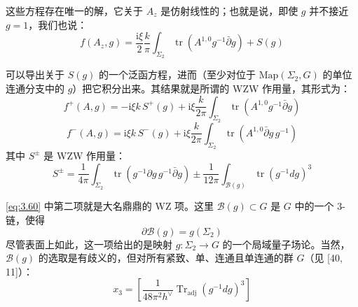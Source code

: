 这些方程存在唯一的解，它关于 $A_{z}$ 是仿射线性的；也就是说，即使 $g$ 并不接近 $g=1$，我们也说：
\begin{equation}
  f(A_{z},g)=\frac{\mathrm{i}\xi}{2}\frac{k}{\pi}\int_{\Sigma_2}\operatorname{tr}\left(A^{1,0}g^{-1}\bar\partial g\right)+S(g)
  \tag{3.57}
  \label{eq:3.57}
\end{equation}

可以导出关于 $S(g)$ 的一个泛函方程，进而（至少对位于 $\mathrm{Map}(\Sigma_2,G)$ 的单位连通分支中的 $g$）把它积分出来。其结果就是所谓的 WZW 作用量，其形式为：
\begin{equation}
  f^{+}(A,g)=-\mathrm{i}\xi k\,S^{+}(g)+\mathrm{i}\xi\frac{k}{2\pi}\int_{\Sigma_2}\operatorname{tr}\left(A^{1,0}g^{-1}\bar\partial g\right)
  \tag{3.58}
  \label{eq:3.58}
\end{equation}
\begin{equation}
  f^{-}(A,g)=\mathrm{i}\xi k\,S^{-}(g)+\mathrm{i}\xi\frac{k}{2\pi}\int_{\Sigma_2}\operatorname{tr}\left(A^{1,0}\bar\partial g\,g^{-1}\right)
  \tag{3.59}
  \label{eq:3.59}
\end{equation}
其中 $S^{\pm}$ 是 WZW 作用量：
\begin{equation}
  S^{\pm}=\frac{1}{4\pi}\int_{\Sigma_2}\operatorname{tr}\left(g^{-1}\partial g\,g^{-1}\bar\partial g\right)\pm\frac{1}{12\pi}\int_{\mathcal{B}(g)}\operatorname{tr}\left(g^{-1}dg\right)^{3}
  \tag{3.60}
  \label{eq:3.60}
\end{equation}

\eqref{eq:3.60} 中第二项就是大名鼎鼎的 WZ 项。这里 $\mathcal{B}(g)\subset G$ 是 $G$ 中的一个 3-链，使得
\begin{equation}
  \partial\mathcal{B}(g)=g(\Sigma_2)
  \tag{3.61}
  \label{eq:3.61}
\end{equation}
尽管表面上如此，这一项给出的是映射 $g:\Sigma_2\to G$ 的一个局域量子场论。当然，$\mathcal{B}(g)$ 的选取是有歧义的，但对所有紧致、单、连通且单连通的群 $G$（见 [40, 11]）：
\begin{equation}
  x_{3}=\left[\frac{1}{48\pi^{2}h^{\vee}}\operatorname{Tr}_{\mathrm{adj}}\left(g^{-1}dg\right)^{3}\right]
  \tag{3.62}
  \label{eq:3.62}
\end{equation}

